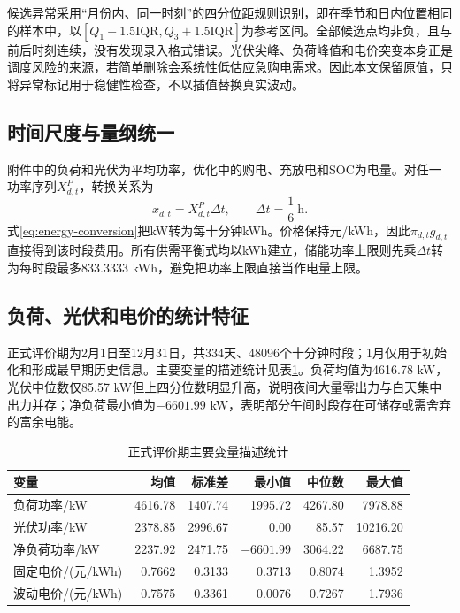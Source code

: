 \documentclass[UTF8,a4paper,12pt,fontset=fandol]{ctexart}
\numberwithin{equation}{section}
\begin{document}
候选异常采用“月份内、同一时刻”的四分位距规则识别，即在季节和日内位置相同的样本中，以$[Q_1-1.5\mathrm{IQR},Q_3+1.5\mathrm{IQR}]$为参考区间。全部候选点均非负，且与前后时刻连续，没有发现录入格式错误。光伏尖峰、负荷峰值和电价突变本身正是调度风险的来源，若简单删除会系统性低估应急购电需求。因此本文保留原值，只将异常标记用于稳健性检查，不以插值替换真实波动。

\subsection{时间尺度与量纲统一}

附件中的负荷和光伏为平均功率，优化中的购电、充放电和SOC为电量。对任一功率序列$X^P_{d,t}$，转换关系为
\begin{equation}
x_{d,t}=X^P_{d,t}\Delta t,\qquad \Delta t=\frac{1}{6}\ \mathrm{h}.
\label{eq:energy-conversion}
\end{equation}
式\ref{eq:energy-conversion}把kW转为每十分钟kWh。价格保持元/kWh，因此$\pi_{d,t}g_{d,t}$直接得到该时段费用。所有供需平衡式均以kWh建立，储能功率上限则先乘$\Delta t$转为每时段最多833.3333 kWh，避免把功率上限直接当作电量上限。

\subsection{负荷、光伏和电价的统计特征}

正式评价期为2月1日至12月31日，共334天、48096个十分钟时段；1月仅用于初始化和形成最早期历史信息。主要变量的描述统计见表\ref{tab:data-stats}。负荷均值为4616.78 kW，光伏中位数仅85.57 kW但上四分位数明显升高，说明夜间大量零出力与白天集中出力并存；净负荷最小值为$-6601.99$ kW，表明部分午间时段存在可储存或需舍弃的富余电能。

\begin{table}[htbp]
\centering
\small
\caption{正式评价期主要变量描述统计}\label{tab:data-stats}
\begin{tabular}{lrrrrr}
\toprule
变量 & 均值 & 标准差 & 最小值 & 中位数 & 最大值\\
\midrule
负荷功率/kW & 4616.78 & 1407.74 & 1995.72 & 4267.80 & 7978.88\\
光伏功率/kW & 2378.85 & 2996.67 & 0.00 & 85.57 & 10216.20\\
净负荷功率/kW & 2237.92 & 2471.75 & $-6601.99$ & 3064.22 & 6687.75\\
固定电价/(元/kWh) & 0.7662 & 0.3133 & 0.3713 & 0.8074 & 1.3952\\
波动电价/(元/kWh) & 0.7575 & 0.3361 & 0.0076 & 0.7267 & 1.7936\\
\bottomrule
\end{tabular}
\end{table}
\end{document}
